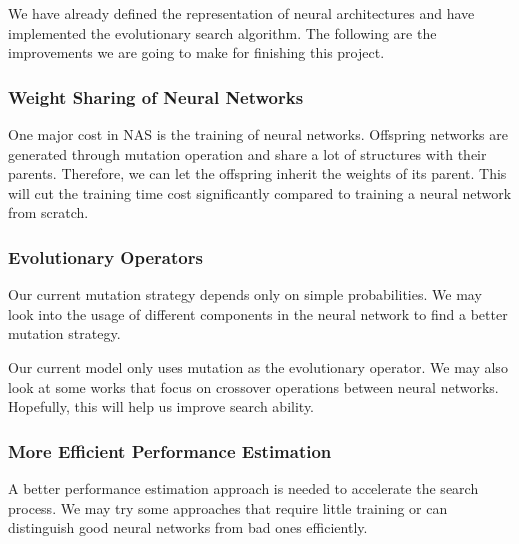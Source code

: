 \documentclass[conference]{IEEEtran}
\begin{document}
We have already defined the representation of neural architectures and have implemented the evolutionary search algorithm. The following are the improvements we are going to make for finishing this project.


\subsubsection{Weight Sharing of Neural Networks}    
One major cost in NAS is the training of neural networks. Offspring networks are generated through mutation operation and share a lot of structures with their parents. Therefore, we can let the offspring inherit the weights of its parent. This will cut the training time cost significantly compared to training a neural network from scratch.

\subsubsection{Evolutionary Operators}
Our current mutation strategy depends only on simple probabilities. We may look into the usage of different components in the neural network to find a better mutation strategy.

Our current model only uses mutation as the evolutionary operator. We may also look at some works that focus on crossover operations between neural networks. Hopefully, this will help us improve search ability.

\subsubsection{More Efficient Performance Estimation}
A better performance estimation approach is needed to accelerate the search process. We may try some approaches that require little training or can distinguish good neural networks from bad ones efficiently.
 



\end{document}
